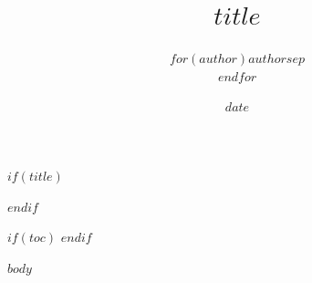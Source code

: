 \documentclass[$if(fontsize)$$fontsize$,$endif$]{article}
\title{$title$}
\author{$for(author)$$author$$sep$ \\ $endfor$}
\date{$date$}
\begin{document}
$if(title)$
\maketitle
$endif$

$if(toc)$
\tableofcontents
\newpage
$endif$

$body$
\end{document}
